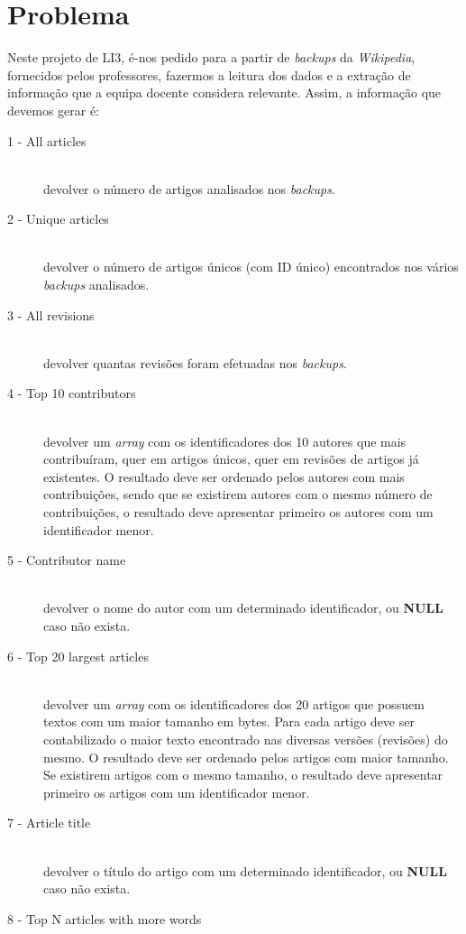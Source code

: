 \documentclass[a4paper]{article}
\begin{document}
\section{Problema}
\label{sec:problema}
Neste projeto de LI3, é-nos pedido para a partir de \textit{backups} da \textit{Wikipedia}, fornecidos pelos professores, fazermos a leitura dos dados e a extração de informação que a equipa docente considera relevante. Assim, a informação que devemos gerar é:
\begin{description}
\item[1 - All articles]\hfill \\
devolver o número de artigos analisados nos \textit{backups}.
\item[2 - Unique articles]\hfill \\
devolver o número de artigos únicos (com ID único) encontrados nos vários \textit{backups} analisados.
\item[3 - All revisions]\hfill \\
devolver quantas revisões foram efetuadas nos \textit{backups}.
\item[4 - Top 10 contributors]\hfill \\
devolver um \textit{array} com os identificadores dos 10 autores que mais contribuíram, quer em artigos únicos, quer em revisões de artigos já existentes. O resultado deve ser ordenado pelos autores com mais contribuições, sendo que se existirem autores com o mesmo número de contribuições, o resultado deve apresentar primeiro os autores com um identificador menor.
\item[5 - Contributor name]\hfill \\
devolver o nome do autor com um determinado identificador, ou \textbf{NULL} caso não exista.
\item[6 - Top 20 largest articles]\hfill \\
devolver um \textit{array} com os identificadores dos 20 artigos que possuem textos com um maior tamanho em bytes. Para cada artigo deve ser contabilizado o maior texto encontrado nas diversas versões (revisões) do mesmo. O resultado deve ser ordenado pelos artigos com maior tamanho. Se existirem artigos com o mesmo tamanho, o resultado deve apresentar primeiro os artigos com um identificador menor.
\item[7 - Article title]\hfill \\
devolver o título do artigo com um determinado identificador, ou \textbf{NULL} caso não exista.
\item[8 - Top N articles with more words]\hfill \\

\end{description}
\end{document}
